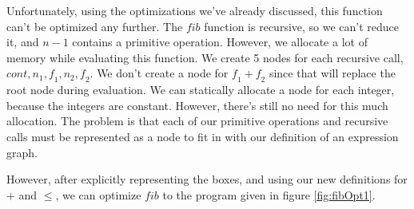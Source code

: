 \documentclass{book}
\theoremstyle{definition}
\newcommand{\Varid}[1]{\mathit{#1}}
\renewcommand{\leq}{\leqslant}
\begin{document}
Unfortunately, using the optimizations we've already discussed,
this function can't be optimized any further.
The \ensuremath{\Varid{fib}} function is recursive, so we can't reduce it,
and \ensuremath{\Varid{n}\mathbin{-}\mathrm{1}} contains a primitive operation.
However, we allocate a lot of memory while evaluating this function.
We create 5 nodes for each recursive call, \ensuremath{\Varid{cont},\Varid{n}_{\mathrm{1}},\Varid{f}_{\mathrm{1}},\Varid{n}_{\mathrm{2}},\Varid{f}_{\mathrm{2}}}.
We don't create a node for \ensuremath{\Varid{f}_{\mathrm{1}}\mathbin{+}\Varid{f}_{\mathrm{2}}} since that will replace the root node
during evaluation.
We can statically allocate a node for each integer, because the integers are constant.
However, there's still no need for this much allocation.
The problem is that each of our primitive operations and recursive calls 
must be represented as a node to fit in with our definition of an expression graph.

However, after explicitly representing the boxes, and using our
new definitions for \ensuremath{\mathbin{+}} and \ensuremath{\leq },
we can optimize \ensuremath{\Varid{fib}} to the program given in figure \ref{fig:fibOpt1}.
\end{document}
